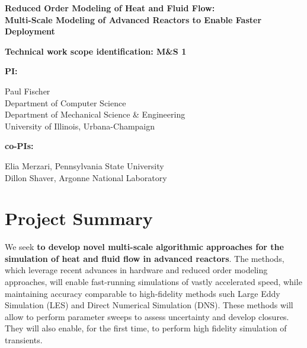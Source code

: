 \parindent 0in
\parskip 0.1in

\begin{center}
{\bf Reduced Order Modeling of Heat and Fluid Flow: \\ 
Multi-Scale Modeling of Advanced Reactors to Enable Faster Deployment}
\end{center}

{\bf Technical work scope identification: M\&S 1 }

{\bf PI: }\begin{minipage}[t]{5in}
Paul Fischer \\
Department of Computer Science \\
Department of Mechanical Science \& Engineering \\
University of Illinois, Urbana-Champaign \\
\end{minipage}

{\bf co-PIs: } \begin{minipage}[t]{5in}
Elia Merzari, Pennsylvania State University \\
Dillon Shaver, Argonne National Laboratory \\[-3ex]
\end{minipage}

\section{Project Summary}


We seek \textbf{to develop novel multi-scale algorithmic approaches for the
simulation of heat and fluid flow in advanced reactors}. The methods, which
leverage recent advances in hardware and reduced order modeling approaches,
will enable fast-running simulations of vastly accelerated speed, while
maintaining accuracy comparable to high-fidelity methods such Large Eddy
Simulation (LES) and Direct Numerical Simulation (DNS). These methods will
allow to perform
parameter sweeps to assess uncertainty and develop closures. They will also
enable, for the first time, to perform high fidelity simulation of transients.

